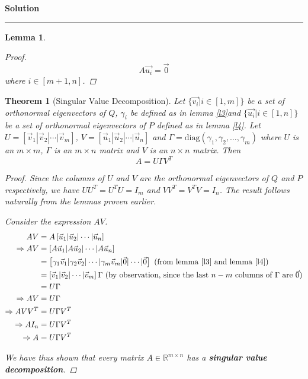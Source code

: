 \documentclass[a4paper,12pt]{article}
\newenvironment{solution}[2][]{%
    \begin{mdframed}[linecolor=blue!70!black, linewidth=2pt, roundcorner=10pt, backgroundcolor=yellow!10!white, skipabove=12pt, skipbelow=12pt]%
        \textbf{\large #2}
        \par\noindent\rule{\textwidth}{0.4pt}
}{
    \end{mdframed}
}
\newtheorem{lemma}{Lemma}
\newtheorem{theorem}{Theorem}
\begin{document}
\begin{solution}{Solution}
\begin{lemma}
\begin{proof}
                  \[A\vec{u_{i}} = \vec{0}\]
              where $i \in [m + 1,n]$.
          \end{proof}
        \end{lemma}
        \begin{theorem}[Singular Value Decomposition]
            Let $\{\vec{v_{i}} | i \in [1,m]\}$ be a set of orthonormal eigenvectors of $Q$, $\gamma_{i}$ be 
            defined as in lemma \@\ref{l3}and $\{\vec{u_{i}} | i \in [1,n]\}$ be a set of orthonormal eigenvectors of 
            $P$ defined as in lemma \@\ref{l4}.
            Let $U = \left[\vec{v}_{1} | \vec{v}_{2} | \cdots | \vec{v}_{m}\right]$,
            $V = \left[\vec{u}_{1} | \vec{u}_{2} | \cdots | \vec{u}_{n}\right]$ and 
            $\Gamma =\text{diag}(\gamma_{1},\gamma_{2},\dots,\gamma_{m})$ where $U$ is an $m \times m$, $\Gamma$ is an 
            $m \times n$ matrix and $V$ is an $n \times n$ matrix. Then \[ A = U \Gamma V^{T} \]
            \begin{proof}
              Since the columns of $U$ and $V$ are the orthonormal eigenvectors of $Q$ and $P$ respectively, we have 
              $UU^{T} = U^{T}U = I_{m}$ and $VV^{T} = V^{T}V = I_{n}$. The result follows naturally from the lemmas proven earlier.
              
              Consider the expression $AV$.
              \begin{align}
                AV &= A \left[ \vec{u}_{1} | \vec{u}_{2} | \cdots | \vec{u}_{n}\right] \nonumber \\
                \Rightarrow AV &= \left[ A\vec{u}_{1} | A\vec{u}_{2} | \cdots | A \vec{u}_{n} \right] \nonumber \\
                               &= \left[ \gamma_{1}\vec{v}_{1} | \gamma_{2}\vec{v}_{2} | \cdots | \gamma_{m} \vec{v}_{m} | 
                               \vec{0} | \cdots |\vec{0}\right] \text{ (from lemma \@\ref{l3} and lemma \@\ref{l4})} \nonumber \\
                               &= \left[\vec{v}_{1} | \vec{v}_{2} | \cdots | \vec{v}_{m}\right] \Gamma \text{ (by observation, since the last $n - m$ columns of $\Gamma$ are $\vec{0}$)}\nonumber \\
                               &= U \Gamma \nonumber \\
                \Rightarrow AV &= U \Gamma \nonumber \\
                \Rightarrow A V V^{T} &= U \Gamma V^{T} \nonumber \\
                \Rightarrow A I_{n} &= U \Gamma V^{T} \nonumber \\
                \Rightarrow A &=  U \Gamma V^{T}
              \end{align}
               
              We have thus shown that every matrix $A \in \mathbb{R}^{m \times n}$ has a \textbf{singular value decomposition}.
            \end{proof}
        \end{theorem}
  \end{solution}
\end{document}
